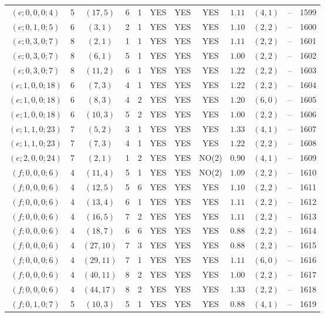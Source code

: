 \begin{longtable}{|c|c|c|c|c|c|c|c|c|c|c|c|}
$(e;0,0,0;4)$ & 5 & $(17,5)$ & 6 & 1 & YES & YES & YES & $1.11$ & $(4,1)$ & -- & 1599\\
$(e;0,1,0;5)$ & 6 & $(3,1)$ & 2 & 1 & YES & YES & YES & $1.10$ & $(2,2)$ & -- & 1600\\
$(e;0,3,0;7)$ & 8 & $(2,1)$ & 1 & 1 & YES & YES & YES & $1.11$ & $(2,2)$ & -- & 1601\\
$(e;0,3,0;7)$ & 8 & $(6,1)$ & 5 & 1 & YES & YES & YES & $1.00$ & $(2,2)$ & -- & 1602\\
$(e;0,3,0;7)$ & 8 & $(11,2)$ & 6 & 1 & YES & YES & YES & $1.22$ & $(2,2)$ & -- & 1603\\
$(e;1,0,0;18)$ & 6 & $(7,3)$ & 4 & 1 & YES & YES & YES & $1.22$ & $(2,2)$ & -- & 1604\\
$(e;1,0,0;18)$ & 6 & $(8,3)$ & 4 & 2 & YES & YES & YES & $1.20$ & $(6,0)$ & -- & 1605\\
$(e;1,0,0;18)$ & 6 & $(10,3)$ & 5 & 2 & YES & YES & YES & $1.00$ & $(2,2)$ & -- & 1606\\
$(e;1,1,0;23)$ & 7 & $(5,2)$ & 3 & 1 & YES & YES & YES & $1.33$ & $(4,1)$ & -- & 1607\\
$(e;1,1,0;23)$ & 7 & $(7,3)$ & 4 & 1 & YES & YES & YES & $1.22$ & $(2,2)$ & -- & 1608\\
$(e;2,0,0;24)$ & 7 & $(2,1)$ & 1 & 2 & YES & YES & NO(2) & $0.90$ & $(4,1)$ & -- & 1609\\
$(f;0,0,0;6)$ & 4 & $(11,4)$ & 5 & 1 & YES & YES & NO(2) & $1.09$ & $(2,2)$ & -- & 1610\\
$(f;0,0,0;6)$ & 4 & $(12,5)$ & 5 & 6 & YES & YES & YES & $1.10$ & $(2,2)$ & -- & 1611\\
$(f;0,0,0;6)$ & 4 & $(13,4)$ & 6 & 1 & YES & YES & YES & $1.11$ & $(2,2)$ & -- & 1612\\
$(f;0,0,0;6)$ & 4 & $(16,5)$ & 7 & 2 & YES & YES & YES & $1.11$ & $(2,2)$ & -- & 1613\\
$(f;0,0,0;6)$ & 4 & $(18,7)$ & 6 & 6 & YES & YES & YES & $0.88$ & $(2,2)$ & -- & 1614\\
$(f;0,0,0;6)$ & 4 & $(27,10)$ & 7 & 3 & YES & YES & YES & $0.88$ & $(2,2)$ & -- & 1615\\
$(f;0,0,0;6)$ & 4 & $(29,11)$ & 7 & 1 & YES & YES & YES & $1.11$ & $(6,0)$ & -- & 1616\\
$(f;0,0,0;6)$ & 4 & $(40,11)$ & 8 & 2 & YES & YES & YES & $1.00$ & $(2,2)$ & -- & 1617\\
$(f;0,0,0;6)$ & 4 & $(44,17)$ & 8 & 2 & YES & YES & YES & $1.33$ & $(2,2)$ & -- & 1618\\
$(f;0,1,0;7)$ & 5 & $(10,3)$ & 5 & 1 & YES & YES & YES & $0.88$ & $(4,1)$ & -- & 1619\\

\end{longtable}
